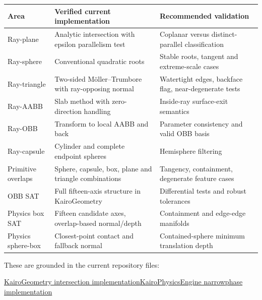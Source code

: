 {\def\LTcaptype{none} %
\begin{longtable}[]{@{}
  >{\raggedright\arraybackslash}p{}
  >{\raggedright\arraybackslash}p{}
  >{\raggedright\arraybackslash}p{}@{}}
\toprule\noalign{}
\begin{minipage}[b]{\linewidth}\raggedright
Area
\end{minipage} & \begin{minipage}[b]{\linewidth}\raggedright
Verified current implementation
\end{minipage} & \begin{minipage}[b]{\linewidth}\raggedright
Recommended validation
\end{minipage} \\
\midrule\noalign{}
\endhead
\bottomrule\noalign{}
\endlastfoot
Ray-plane & Analytic intersection with epsilon parallelism test & Coplanar versus distinct-parallel classification \\
Ray-sphere & Conventional quadratic roots & Stable roots, tangent and extreme-scale cases \\
Ray-triangle & Two-sided Möller--Trumbore with ray-opposing normal & Watertight edges, backface flag, near-degenerate tests \\
Ray-AABB & Slab method with zero-direction handling & Inside-ray surface-exit semantics \\
Ray-OBB & Transform to local AABB and back & Parameter consistency and valid OBB basis \\
Ray-capsule & Cylinder and complete endpoint spheres & Hemisphere filtering \\
Primitive overlaps & Sphere, capsule, box, plane and triangle combinations & Tangency, containment, degenerate feature cases \\
OBB SAT & Full fifteen-axis structure in KairoGeometry & Differential tests and robust tolerances \\
Physics box SAT & Fifteen candidate axes, overlap-based normal/depth & Containment and edge-edge manifolds \\
Physics sphere-box & Closest-point contact and fallback normal & Contained-sphere minimum translation depth \\
\end{longtable}
}

These are grounded in the current repository files:

\href{https://github.com/swayam8624/KairoGeometry/blob/master/Intersection.cppm?utm_source=chatgpt.com}{KairoGeometry intersection implementation}\href{https://github.com/swayam8624/KairoPhysicsEngine/blob/main/Narrowphase.cppm?utm_source=chatgpt.com}{KairoPhysicsEngine narrowphase implementation}

